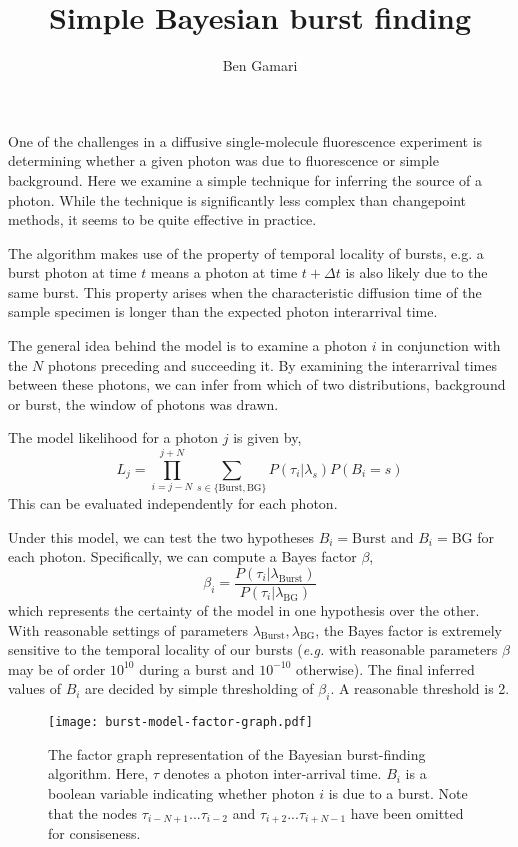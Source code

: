 \documentclass{article}
\title{Simple Bayesian burst finding}
\author{Ben Gamari}
\newcommand{\lburst}{\ensuremath{\lambda_\mathrm{Burst}}}
\newcommand{\lbg}{\ensuremath{\lambda_\mathrm{BG}}}
\begin{document}
\maketitle

One of the challenges in a diffusive single-molecule fluorescence
experiment is determining whether a given photon was due to
fluorescence or simple background. Here we examine a simple technique
for inferring the source of a photon. While the technique is
significantly less complex than changepoint
methods\cite{watkins2005,ensign2010}, it seems to be quite effective
in practice.

The algorithm makes use of the property of temporal locality of
bursts, e.g. a burst photon at time $t$ means a photon at time $t +
\Delta t$ is also likely due to the same burst. This property arises
when the characteristic diffusion time of the sample specimen is 
longer than the expected photon interarrival time.

The general idea behind the model is to examine a photon $i$ in
conjunction with the $N$ photons preceding and succeeding it. By
examining the interarrival times between these photons, we can infer
from which of two distributions, background or burst, the window of
photons was drawn.

The model likelihood for a photon $j$ is given by,
\begin{equation}
  L_j = \prod_{i=j-N}^{j+N} \sum_{s\in\{\mathrm{Burst}, \mathrm{BG}\}} P(\tau_i \vert \lambda_s) P(B_i = s)
\end{equation}
This can be evaluated independently for each photon.

Under this model, we can test the two hypotheses $B_i =
\mathrm{Burst}$ and $B_i = \mathrm{BG}$ for each photon. Specifically,
we can compute a Bayes factor $\beta$,
\begin{equation}
  \beta_i = \frac{P(\tau_i \vert \lburst)}{P(\tau_i \vert \lbg)}
\end{equation}
which represents the certainty of the model in one hypothesis over the
other. With reasonable settings of parameters $\lburst, \lbg$, the
Bayes factor is extremely sensitive to the temporal locality of our
bursts ({\it e.g.} with reasonable parameters $\beta$ may be of order
$10^{10}$ during a burst and $10^{-10}$ otherwise). The final inferred
values of $B_i$ are decided by simple thresholding of $\beta_i$. A
reasonable threshold is 2.

\begin{figure}
\centering
\texttt{[image: burst-model-factor-graph.pdf]}
\caption{The factor graph representation of the Bayesian burst-finding
algorithm. Here, $\tau$ denotes a photon inter-arrival time. $B_i$ is
a boolean variable indicating whether photon $i$ is due to a
burst. Note that the nodes $\tau_{i-N+1} ... \tau_{i-2}$ and
$\tau_{i+2} ... \tau_{i+N-1}$ have been omitted for consiseness.}
\end{figure}
\end{document}
